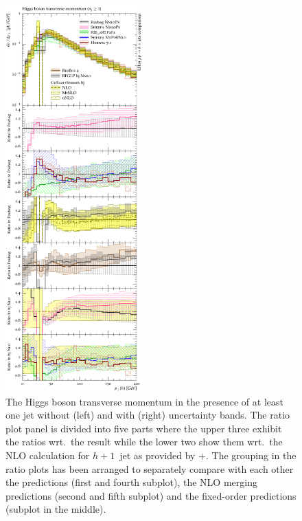 \begin{figure}[p]
  \includegraphics[width=0.47\textwidth]{figures/hjetscomp_H_j_pT_incl.pdf}
  \caption{\label{fig:hjetscomp:results:1obs:hpt}%
    The Higgs boson transverse momentum in the presence of at least
    one jet without (left) and with (right) uncertainty bands. The
    ratio plot panel is divided into five parts where the upper three
    exhibit the ratios wrt.~the \Powheg \NNLOPS result while the lower
    two show them wrt.~the NLO calculation for $h+1$~jet as
    provided by \GoSam{}+\Sherpa. The grouping in the ratio plots has
    been arranged to separately compare with each other the \NNLOPS
    predictions (first and fourth subplot), the NLO merging
    predictions (second and fifth subplot) and the fixed-order
    predictions (subplot in the middle).}
\end{figure}

